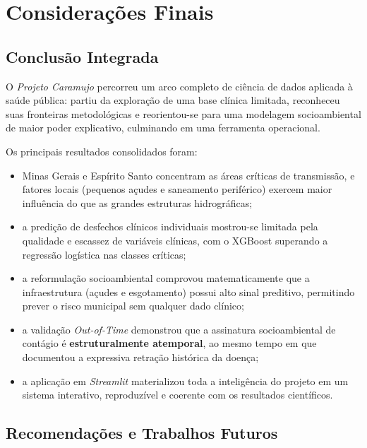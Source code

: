 \documentclass[12pt]{article}
\begin{document}
\section{Considerações Finais}

\subsection{Conclusão Integrada}

O \textit{Projeto Caramujo} percorreu um arco completo de ciência de dados aplicada à
saúde pública: partiu da exploração de uma base clínica limitada, reconheceu suas
fronteiras metodológicas e reorientou-se para uma modelagem socioambiental de maior poder
explicativo, culminando em uma ferramenta operacional.

Os principais resultados consolidados foram:

\begin{itemize}
    \item Minas Gerais e Espírito Santo concentram as áreas críticas de transmissão, e
    fatores locais (pequenos açudes e saneamento periférico) exercem maior influência do
    que as grandes estruturas hidrográficas;

    \item a predição de desfechos clínicos individuais mostrou-se limitada pela qualidade
    e escassez de variáveis clínicas, com o XGBoost superando a regressão logística nas
    classes críticas;

    \item a reformulação socioambiental comprovou matematicamente que a infraestrutura
    (açudes e esgotamento) possui alto sinal preditivo, permitindo prever o risco
    municipal sem qualquer dado clínico;

    \item a validação \textit{Out-of-Time} demonstrou que a assinatura socioambiental de
    contágio é \textbf{estruturalmente atemporal}, ao mesmo tempo em que documentou a
    expressiva retração histórica da doença;

    \item a aplicação em \textit{Streamlit} materializou toda a inteligência do projeto em
    um sistema interativo, reproduzível e coerente com os resultados científicos.
\end{itemize}

\subsection{Recomendações e Trabalhos Futuros}
\end{document}
